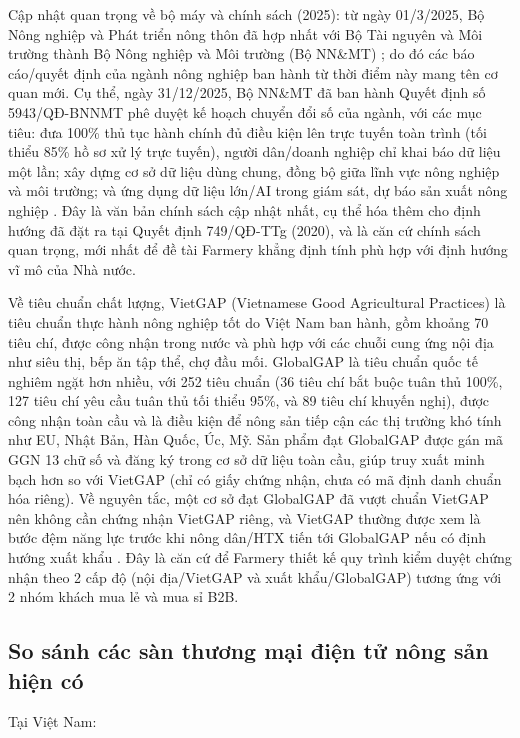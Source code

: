 Cập nhật quan trọng về bộ máy và chính sách (2025): từ ngày 01/3/2025, Bộ Nông nghiệp và Phát triển nông thôn đã hợp nhất với Bộ Tài nguyên và Môi trường thành Bộ Nông nghiệp và Môi trường (Bộ NN\&MT) \cite{botnmt_2025}; do đó các báo cáo/quyết định của ngành nông nghiệp ban hành từ thời điểm này mang tên cơ quan mới. Cụ thể, ngày 31/12/2025, Bộ NN\&MT đã ban hành Quyết định số 5943/QĐ-BNNMT phê duyệt kế hoạch chuyển đổi số của ngành, với các mục tiêu: đưa 100\% thủ tục hành chính đủ điều kiện lên trực tuyến toàn trình (tối thiểu 85\% hồ sơ xử lý trực tuyến), người dân/doanh nghiệp chỉ khai báo dữ liệu một lần; xây dựng cơ sở dữ liệu dùng chung, đồng bộ giữa lĩnh vực nông nghiệp và môi trường; và ứng dụng dữ liệu lớn/AI trong giám sát, dự báo sản xuất nông nghiệp \cite{qd5943_2025}. Đây là văn bản chính sách cập nhật nhất, cụ thể hóa thêm cho định hướng đã đặt ra tại Quyết định 749/QĐ-TTg (2020), và là căn cứ chính sách quan trọng, mới nhất để đề tài Farmery khẳng định tính phù hợp với định hướng vĩ mô của Nhà nước.

Về tiêu chuẩn chất lượng, VietGAP (Vietnamese Good Agricultural Practices) là tiêu chuẩn thực hành nông nghiệp tốt do Việt Nam ban hành, gồm khoảng 70 tiêu chí, được công nhận trong nước và phù hợp với các chuỗi cung ứng nội địa như siêu thị, bếp ăn tập thể, chợ đầu mối. GlobalGAP là tiêu chuẩn quốc tế nghiêm ngặt hơn nhiều, với 252 tiêu chuẩn (36 tiêu chí bắt buộc tuân thủ 100\%, 127 tiêu chí yêu cầu tuân thủ tối thiểu 95\%, và 89 tiêu chí khuyến nghị), được công nhận toàn cầu và là điều kiện để nông sản tiếp cận các thị trường khó tính như EU, Nhật Bản, Hàn Quốc, Úc, Mỹ. Sản phẩm đạt GlobalGAP được gán mã GGN 13 chữ số và đăng ký trong cơ sở dữ liệu toàn cầu, giúp truy xuất minh bạch hơn so với VietGAP (chỉ có giấy chứng nhận, chưa có mã định danh chuẩn hóa riêng). Về nguyên tắc, một cơ sở đạt GlobalGAP đã vượt chuẩn VietGAP nên không cần chứng nhận VietGAP riêng, và VietGAP thường được xem là bước đệm năng lực trước khi nông dân/HTX tiến tới GlobalGAP nếu có định hướng xuất khẩu \cite{vietgap_globalgap}. Đây là căn cứ để Farmery thiết kế quy trình kiểm duyệt chứng nhận theo 2 cấp độ (nội địa/VietGAP và xuất khẩu/GlobalGAP) tương ứng với 2 nhóm khách mua lẻ và mua sỉ B2B.

\subsection{So sánh các sàn thương mại điện tử nông sản hiện có}

Tại Việt Nam:

